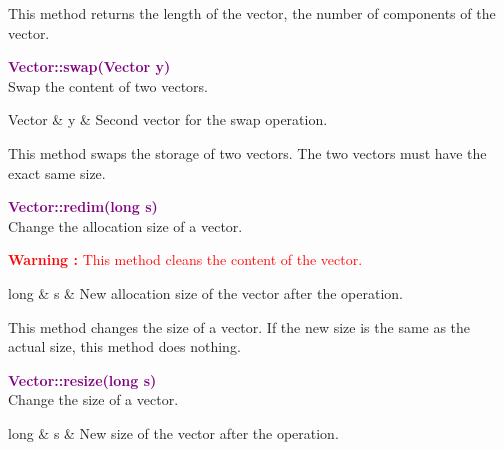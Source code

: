 This method returns the length of the vector, \ie the number of components of the vector.

\textcolor{purple}{\textbf{Vector::swap(Vector y)}}\label{Vector::swap(Vector y)}\\
Swap the content of two vectors.

\begin{tcolorbox}[width=\textwidth,myArgs,tabularx={ll|R}]
Vector & y & Second vector for the swap operation.
\end{tcolorbox}

This method swaps the storage of two vectors.
The two vectors must have the exact same size.

\textcolor{purple}{\textbf{Vector::redim(long s)}}\label{Vector::redim(long s)}\\
Change the allocation size of a vector.

\hspace*{10mm}\textcolor{red}{\textbf{Warning :} This method cleans the content of the vector.}

\begin{tcolorbox}[width=\textwidth,myArgs,tabularx={ll|R}]
long & s & New allocation size of the vector after the operation.
\end{tcolorbox}

This method changes the size of a vector.
If the new size is the same as the actual size, this method does nothing.

\textcolor{purple}{\textbf{Vector::resize(long s)}}\label{Vector::resize(long s)}\\
Change the size of a vector.

\begin{tcolorbox}[width=\textwidth,myArgs,tabularx={ll|R}]
long & s & New size of the vector after the operation.
\end{tcolorbox}

